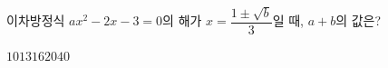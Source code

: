이차방정식 $ax^2-2x-3=0$의 해가 $x=\dfrac{1\pm\sqrt{b}}{3}$일 때, $a+b$의 값은? 
\begin{choices32}{$10$}{$13$}{$16$}{$20$}{$40$}\end{choices32}
